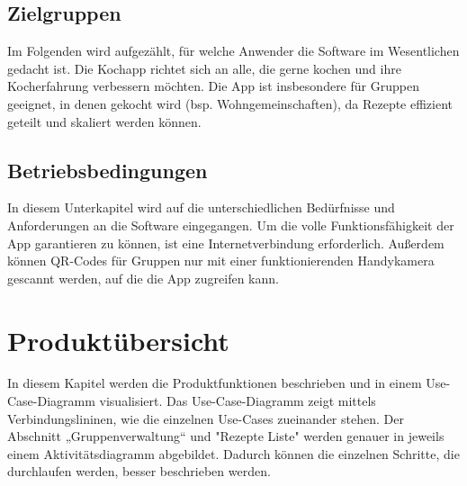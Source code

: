 \documentclass[parskip=full]{scrartcl}
\begin{document}
\subsection{Zielgruppen}
Im Folgenden wird aufgezählt, für welche Anwender die Software im Wesentlichen gedacht ist. \newline
Die Kochapp richtet sich an alle, die gerne kochen und ihre Kocherfahrung verbessern möchten. 
Die App ist insbesondere für Gruppen geeignet, in denen gekocht wird (bsp. Wohngemeinschaften), da Rezepte effizient geteilt und skaliert werden können.

\subsection{Betriebsbedingungen}
In diesem Unterkapitel wird auf die unterschiedlichen Bedürfnisse und Anforderungen an die Software eingegangen. \newline
Um die volle Funktionsfähigkeit der App garantieren zu können, ist eine Internetverbindung erforderlich. Außerdem können QR-Codes für Gruppen nur mit einer funktionierenden Handykamera gescannt werden, auf die die App zugreifen kann.

\section{Produktübersicht}
In diesem Kapitel werden die Produktfunktionen beschrieben und in einem Use-Case-Diagramm visualisiert.
Das Use-Case-Diagramm zeigt mittels Verbindungslininen, wie die einzelnen Use-Cases zueinander stehen.
Der Abschnitt „Gruppenverwaltung“ und "Rezepte Liste" werden genauer in jeweils einem Aktivitätsdiagramm abgebildet.
Dadurch können die einzelnen Schritte, die durchlaufen werden, besser beschrieben werden.
\end{document}

